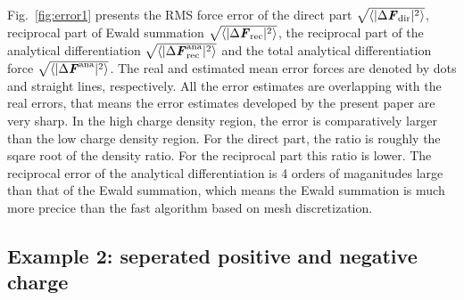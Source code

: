 \documentclass[aps,pre,preprint]{revtex4}
\renewcommand{\v}[1]{\textbf{\textit{#1}}}
\begin{document}
Fig.~\ref{fig:error1} presents the RMS force error of the direct part
$\sqrt{\langle\vert\Delta \v F_{\textrm{dir}}\vert^2\rangle}$,
reciprocal part of Ewald summation $\sqrt{\langle\vert\Delta \v
  F_{\textrm{rec}}\vert^2\rangle}$, the reciprocal part of the
analytical differentiation $\sqrt{\langle\vert\Delta \v
  F^{\textrm{ana}}_{\textrm{rec}}\vert^2\rangle}$ and the total
analytical differentiation force $\sqrt{\langle\vert\Delta \v
  F^{\textrm{ana}}\vert^2\rangle}$.  The real and estimated mean error
forces are denoted by dots and straight lines, respectively. All the
error estimates are overlapping with the real errors, that means the
error estimates developed by the present paper are very sharp.
In the high charge density region, the error is comparatively larger
than the low charge density region. For the direct part, the ratio is
roughly the sqare root of the density ratio. For the reciprocal part
this ratio is lower. The reciprocal error of the analytical
differentiation is 4 orders of maganitudes large than that of the
Ewald summation, which means the Ewald summation is much more precice
than the fast algorithm based on mesh discretization.




\subsection{Example 2: seperated positive and negative charge}
\end{document}
